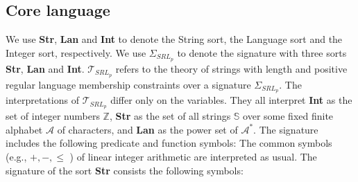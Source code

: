 \subsection{Core language}
\label{sec:Theories over Strings}
We use \textbf{Str}, \textbf{Lan} and \textbf{Int} to denote the String sort, the Language sort and the Integer sort, respectively. We use \( \Sigma_{SRL_p}\) to denote the signature with three sorts \textbf{Str}, \textbf{Lan} and \textbf{Int}. \(\mathcal{T}_{SRL_p}\) refers to the theory of strings with length and positive regular language membership constraints over a signature \( \Sigma_{SRL_p}\). The interpretations of \(\mathcal{T}_{SRL_p}\) differ only on the variables. They all interpret \textbf{Int} as the set of integer numbers  \(\mathbb{Z}\), \textbf{Str} as the set of all strings  \(\mathbb{S}\)  over some fixed finite alphabet  \(\mathcal{A}\) of characters, and \textbf{Lan} as the power set of \(\mathcal{A}^* \).
The signature includes the following predicate and function symbols:
The common symbols (e.g., \( + , - ,  \le \) ) of linear integer arithmetic are interpreted as usual. The signature of the sort \textbf{Str} consists the following symbols:

